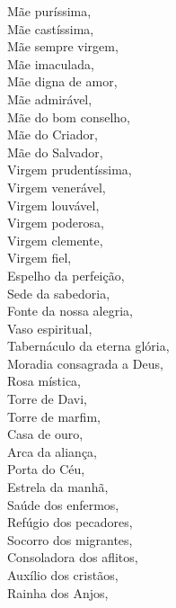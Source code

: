 \documentclass{book}
\begin{document}
\begin{flushleft}
    \VbarRed{} Mãe puríssima, \\
    \VbarRed{} Mãe castíssima, \\
    \VbarRed{} Mãe sempre virgem, \\
    \VbarRed{} Mãe imaculada, \\
    \VbarRed{} Mãe digna de amor, \\
    \VbarRed{} Mãe admirável, \\
    \VbarRed{} Mãe do bom conselho, \\
    \VbarRed{} Mãe do Criador, \\
    \VbarRed{} Mãe do Salvador, \\
    \VbarRed{} Virgem prudentíssima, \\
    \VbarRed{} Virgem venerável, \\
    \VbarRed{} Virgem louvável, \\
    \VbarRed{} Virgem poderosa, \\
    \VbarRed{} Virgem clemente, \\
    \VbarRed{} Virgem fiel, \\
    \VbarRed{} Espelho da perfeição, \\
    \VbarRed{} Sede da sabedoria, \\
    \VbarRed{} Fonte da nossa alegria, \\
    \VbarRed{} Vaso espiritual, \\
    \VbarRed{} Tabernáculo da eterna glória, \\
    \VbarRed{} Moradia consagrada a Deus, \\
    \VbarRed{} Rosa mística, \\
    \VbarRed{} Torre de Davi, \\
    \VbarRed{} Torre de marfim, \\
    \VbarRed{} Casa de ouro, \\
    \VbarRed{} Arca da aliança, \\
    \VbarRed{} Porta do Céu, \\
    \VbarRed{} Estrela da manhã, \\
    \VbarRed{} Saúde dos enfermos, \\
    \VbarRed{} Refúgio dos pecadores, \\
    \VbarRed{} Socorro dos migrantes, \\
    \VbarRed{} Consoladora dos aflitos, \\
    \VbarRed{} Auxílio dos cristãos, \\
    \VbarRed{} Rainha dos Anjos, \\

\end{flushleft}
\end{document}
